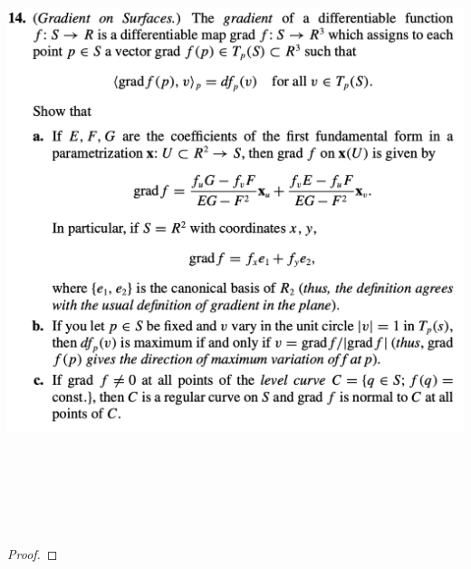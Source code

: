 \documentclass{report}
\begin{document}
\begin{question}{}{}
\includegraphics[height=18cm,width=18cm]{hw4q13}
\end{question}
\begin{proof}

\end{proof}
\end{document}

